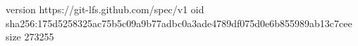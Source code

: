 version https://git-lfs.github.com/spec/v1
oid sha256:175d5258325ac75b5c09a9b77adbc0a3ade4789df075d0e6b855989ab13c7cee
size 273255
